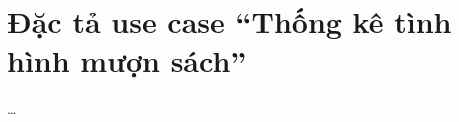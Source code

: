 \documentclass[../DoAn.tex]{subfiles}
\begin{document}
\section{Đặc tả use case ``Thống kê tình hình mượn sách''}
\ldots
\end{document}
